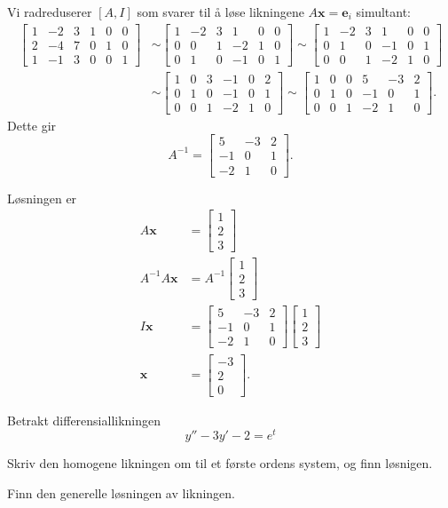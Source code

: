 \documentclass[titlepage,a4paper,12pt,norsk]{IMFeksamen}
\newcommand{\V}[1]{\mathbf{#1}}
\newcommand{\vvv}[3]{\begin{bmatrix} #1 \\ #2 \\ #3 \end{bmatrix}}
\newcommand{\x}{\V{x}}
\newcommand{\0}{\V{0}}
\begin{document}
\begin{oppgave}
Vi radreduserer $[A, I]$ som svarer til å løse likningene $A\x=\V{e}_i$ simultant: 
\begin{align*}
\begin{bmatrix}
1 & -2 & 3 & 1 & 0 & 0\\
2 & -4 & 7 & 0 & 1 & 0\\
1 & -1 & 3 & 0 & 0 & 1
\end{bmatrix}
&\sim
\begin{bmatrix}
1 & -2 & 3 & 1  & 0 & 0\\
0 & 0  & 1 & -2 & 1 & 0\\
0 & 1  & 0 & -1 & 0 & 1
\end{bmatrix}
\sim 
\begin{bmatrix}
1 & -2 & 3 & 1  & 0 & 0\\
0 & 1  & 0 & -1 & 0 & 1\\
0 & 0  & 1 & -2 & 1 & 0
\end{bmatrix}\\
&\sim
\begin{bmatrix}
1 & 0 & 3 & -1 & 0 & 2\\
0 & 1 & 0 & -1 & 0 & 1\\
0 & 0 & 1 & -2 & 1 & 0
\end{bmatrix}
\sim
\begin{bmatrix}
1 & 0 & 0 & 5  & -3 & 2\\
0 & 1 & 0 & -1 & 0  & 1\\
0 & 0 & 1 & -2 & 1  & 0
\end{bmatrix}.
\end{align*}
Dette gir
\[
A^{-1}=
\begin{bmatrix}
5  & -3 & 2\\
-1 & 0  & 1\\
-2 & 1  & 0
\end{bmatrix}.
\]

Løsningen er
\begin{align*}
A\x&=\vvv{1}{2}{3}\\
A^{-1}A\x&=A^{-1}\vvv{1}{2}{3}\\
I\x&=\begin{bmatrix}
5  & -3 & 2\\
-1 & 0  & 1\\
-2 & 1  & 0
\end{bmatrix}
\vvv{1}{2}{3}\\
\x&=\vvv{-3}{2}{0}.
\end{align*}
\end{oppgave}


\begin{oppgave}
Betrakt differensiallikningen
\[
y''-3y'-2=e^t
\]
\begin{punkt}
Skriv den homogene likningen om til et første ordens system, og finn løsnigen. 
\end{punkt}
\begin{punkt}
Finn den generelle løsningen av likningen.
\end{punkt}
\end{oppgave}
\end{document}
